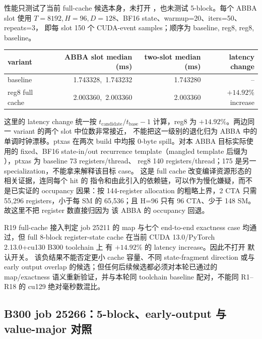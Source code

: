性能只测试了当前 full-cache 候选本身，未打开
，也未测试 5-block。每个 ABBA slot
使用 \(T=8192,H=96,D=128\)、BF16 state、warmup=20、iters=50、repeats=3，
即每 slot 150 个 CUDA-event samples；顺序为 baseline, reg8, reg8, baseline。

\begin{center}
\small
\begin{tabular}{@{}l r r r@{}}
\toprule
variant & ABBA slot median (ms) & two-slot median (ms) & latency change \\
\midrule
baseline & 1.743328,\ 1.743232 & 1.743280 & -- \\
reg8 full cache & 2.003360,\ 2.003360 & 2.003360 & $+14.92\%$ increase \\
\bottomrule
\end{tabular}
\end{center}

这里的 latency change 统一按 \(t_{\mathrm{candidate}}/t_{\mathrm{base}}-1\)
计算，reg8 为 \(+14.92\%\)。两边同一 variant 的两个 slot 中位数非常接近，
不能把这一级别的退化归为 ABBA 中的单调时钟漂移。ptxas
在两次 build 中均报 0-byte spill。对本 ABBA 目标实际使用的 fixed、BF16
state-in/out recurrence template（mangled template 后缀为
），ptxas 为 baseline 73 registers/thread、
reg8 140 registers/thread；175 是另一 specialization，不能拿来解释该目标 case。
这是 full cache 改变编译资源形态的相关证据，连同每个 hit 的 
指令和由此引入的依赖链，可以作为慢化嫌疑，而不是已实证的 occupancy 因果：按
144-register allocation 的粗略上界，2 CTA 只需 55,296 registers，小于每 SM
的 65,536；且 H=96 只有 96 CTA、少于 148 SM。故这里不把 register 数直接归因为
该 ABBA 的 occupancy 回退。

\begin{decision}{R19 full-cache 接入判定}
job 25211 的 map 与七个 end-to-end exactness case 均通过，但 full 8-block
register-state cache 在当前 CUDA 13.0/PyTorch 2.13.0+cu130 B300 toolchain 上
有 \(+14.92\%\) 的 latency increase。因此不打开
 默认开关。
该负结果不能否定更小 cache 容量、不同 state-fragment direction 或与 early
output overlap 的候选；但任何后续候选都必须对本轮已通过的 map/exactness
语义重新验证，并与本轮同 toolchain baseline 配对，不能同 R1--R18 的 cu129
绝对毫秒数混比。
\end{decision}

\subsection{B300 job 25266：5-block、early-output 与 value-major 对照}

